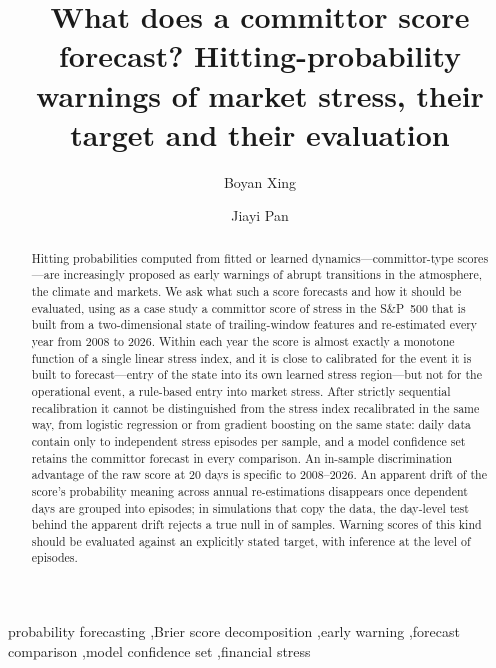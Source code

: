 \documentclass[preprint,12pt,authoryear]{elsarticle}
\begin{document}
\begin{frontmatter}
\title{What does a committor score forecast? Hitting-probability warnings of market stress, their target and their evaluation}
\author[math]{Boyan Xing}
\author[acc]{Jiayi Pan}
\begin{abstract}
Hitting probabilities computed from fitted or learned dynamics---committor-type scores---are increasingly proposed as early warnings of abrupt transitions in the atmosphere, the climate and markets. We ask what such a score forecasts and how it should be evaluated, using as a case study a committor score of stress in the S\&P~500 that is built from a two-dimensional state of trailing-window features and re-estimated every year from 2008 to 2026. Within each year the score is almost exactly a monotone function of a single linear stress index, and it is close to calibrated for the event it is built to forecast---entry of the state into its own learned stress region---but not for the operational event, a rule-based entry into market stress. After strictly sequential recalibration it cannot be distinguished from the stress index recalibrated in the same way, from logistic regression or from gradient boosting on the same state: daily data contain only \EpisMin to \EpisMax independent stress episodes per sample, and a model confidence set retains the committor forecast in every comparison. An in-sample discrimination advantage of the raw score at 20 days is specific to 2008--2026. An apparent drift of the score's probability meaning across annual re-estimations disappears once dependent days are grouped into episodes; in simulations that copy the data, the day-level test behind the apparent drift rejects a true null in \SizeChiFive of samples. Warning scores of this kind should be evaluated against an explicitly stated target, with inference at the level of episodes.
\end{abstract}
\begin{keyword}
probability forecasting \sep Brier score decomposition \sep early warning \sep forecast comparison \sep model confidence set \sep financial stress
\end{keyword}
\end{frontmatter}
\doublespacing
\end{document}
